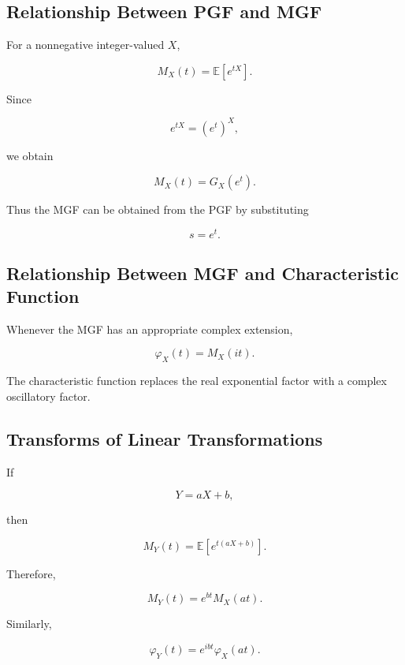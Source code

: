\subsection{Relationship Between PGF and MGF}
\label{subsec:pgf-mgf-relation}

For a nonnegative integer-valued \(X\),

\[
M_X(t)
=
\mathbb{E}[e^{tX}].
\]

Since

\[
e^{tX}
=
(e^t)^X,
\]

we obtain

\[
\boxed{
M_X(t)
=
G_X(e^t).
}
\]

Thus the MGF can be obtained from the PGF by substituting

\[
s=e^t.
\]

\subsection{Relationship Between MGF and Characteristic Function}
\label{subsec:mgf-cf-relation}

Whenever the MGF has an appropriate complex extension,

\[
\boxed{
\varphi_X(t)
=
M_X(it).
}
\]

The characteristic function replaces the real exponential factor with
a complex oscillatory factor.

\subsection{Transforms of Linear Transformations}
\label{subsec:transforms-linear-transformations}

If

\[
Y=aX+b,
\]

then

\[
M_Y(t)
=
\mathbb{E}
[
e^{t(aX+b)}
].
\]

Therefore,

\[
\boxed{
M_Y(t)
=
e^{bt}
M_X(at).
}
\]

Similarly,

\[
\boxed{
\varphi_Y(t)
=
e^{ibt}
\varphi_X(at).
}
\]

